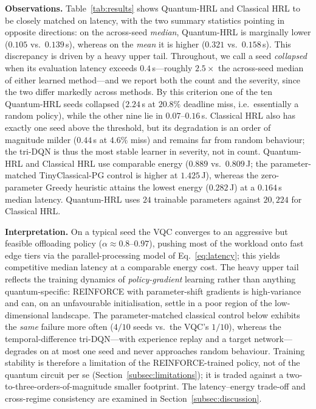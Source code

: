 \documentclass[11pt,a4paper]{article}
\theoremstyle{definition}
\begin{document}
\noindent\textbf{Observations.} Table~\ref{tab:results} shows Quantum-HRL and Classical HRL to be closely matched on latency, with the two summary statistics pointing in opposite directions: on the across-seed \emph{median}, Quantum-HRL is marginally lower ($0.105$ vs.\ $0.139$\,s), whereas on the \emph{mean} it is higher ($0.321$ vs.\ $0.158$\,s). This discrepancy is driven by a heavy upper tail. Throughout, we call a seed \emph{collapsed} when its evaluation latency exceeds $0.4$\,s---roughly $2.5\times$ the across-seed median of either learned method---and we report both the count and the severity, since the two differ markedly across methods. By this criterion one of the ten Quantum-HRL seeds collapsed ($2.24$\,s at $20.8\%$ deadline miss, i.e.\ essentially a random policy), while the other nine lie in $0.07$--$0.16$\,s. Classical HRL also has exactly one seed above the threshold, but its degradation is an order of magnitude milder ($0.44$\,s at $4.6\%$ miss) and remains far from random behaviour; the tri-DQN is thus the most stable learner in severity, not in count. Quantum-HRL and Classical HRL use comparable energy ($0.889$ vs.\ $0.809$\,J; the parameter-matched TinyClassical-PG control is higher at $1.425$\,J), whereas the zero-parameter Greedy heuristic attains the lowest energy ($0.282$\,J) at a $0.164$\,s median latency. Quantum-HRL uses $24$ trainable parameters against $20{,}224$ for Classical HRL.

\noindent\textbf{Interpretation.} On a typical seed the VQC converges to an aggressive but feasible offloading policy ($\alpha\approx0.8$--$0.97$), pushing most of the workload onto fast edge tiers via the parallel-processing model of Eq.~\eqref{eq:latency}; this yields competitive median latency at a comparable energy cost. The heavy upper tail reflects the training dynamics of \emph{policy-gradient} learning rather than anything quantum-specific: REINFORCE with parameter-shift gradients is high-variance and can, on an unfavourable initialisation, settle in a poor region of the low-dimensional landscape. The parameter-matched classical control below exhibits the \emph{same} failure more often ($4/10$ seeds vs.\ the VQC's $1/10$), whereas the temporal-difference tri-DQN---with experience replay and a target network---degrades on at most one seed and never approaches random behaviour. Training stability is therefore a limitation of the REINFORCE-trained policy, not of the quantum circuit per se (Section~\ref{subsec:limitations}); it is traded against a two-to-three-orders-of-magnitude smaller footprint. The latency--energy trade-off and cross-regime consistency are examined in Section~\ref{subsec:discussion}.
\end{document}
